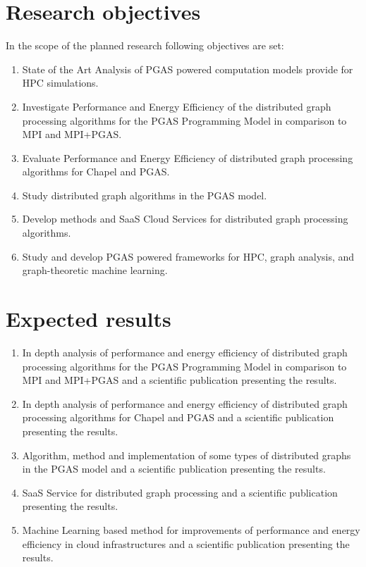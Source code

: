 \documentclass[14pt]{extreport}
\newcommand\blankpage{
    \null
    \thispagestyle{empty}
    \newpage
    }
\begin{document}
\blankpage
\chapter{Research objectives}
In the scope of the planned research following objectives are set:

\begin{enumerate}
	\item State of the Art Analysis of PGAS powered computation models provide for HPC simulations.
	\item Investigate Performance and Energy Efficiency of the distributed graph processing algorithms for the PGAS Programming Model in comparison to MPI and MPI+PGAS.
	\item Evaluate Performance and Energy Efficiency of distributed graph processing algorithms for Chapel and PGAS.
	\item Study distributed graph algorithms in the PGAS model.
	\item Develop methods and SaaS Cloud Services for distributed graph processing algorithms.
	\item Study and develop PGAS powered frameworks for HPC, graph analysis, and graph-theoretic machine learning.
\end{enumerate}

\blankpage
\chapter{Expected results}
\begin{enumerate}
	\item In depth analysis of performance and energy efficiency of distributed graph processing algorithms for the PGAS Programming Model in comparison to MPI and MPI+PGAS and a scientific publication presenting the results.
	\item In depth analysis of performance and energy efficiency of distributed graph processing algorithms for Chapel and PGAS and a scientific publication presenting the results.
	\item Algorithm, method and implementation of some types of distributed graphs in the PGAS model and a scientific publication presenting the results.
	\item SaaS Service for distributed graph processing and a scientific publication presenting the results.
	\item Machine Learning based method for improvements of performance and energy efficiency in cloud infrastructures and a scientific publication presenting the results.
\end{enumerate}
\end{document}
